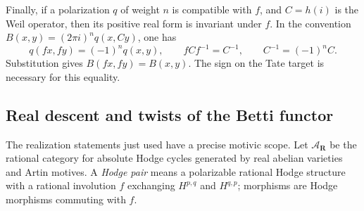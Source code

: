 \documentclass[11pt]{article}
\theoremstyle{definition}\newtheorem{definition}[theorem]{Definition}
\theoremstyle{remark}\newtheorem{remark}[theorem]{Remark}
\newcommand{\R}{\mathbf R}\newcommand{\C}{\mathbf C}
\begin{document}
Finally, if a polarization $q$ of weight $n$ is compatible with $f$, and $C=h(i)$ is the Weil operator, then its positive real form is invariant under $f$. In the convention $B(x,y)=(2\pi i)^nq(x,Cy)$, one has
\[
 q(fx,fy)=(-1)^nq(x,y),\qquad fCf^{-1}=C^{-1},\qquad C^{-1}=(-1)^nC.
\]
Substitution gives $B(fx,fy)=B(x,y)$. The sign on the Tate target is necessary for this equality.

\subsection{Real descent and twists of the Betti functor}
The realization statements just used have a precise motivic scope. Let $\mathcal A_{\R}$ be the rational category for absolute Hodge cycles generated by real abelian varieties and Artin motives. A \emph{Hodge pair} means a polarizable rational Hodge structure with a rational involution $f$ exchanging $H^{p,q}$ and $H^{q,p}$; morphisms are Hodge morphisms commuting with $f$.
\end{document}
